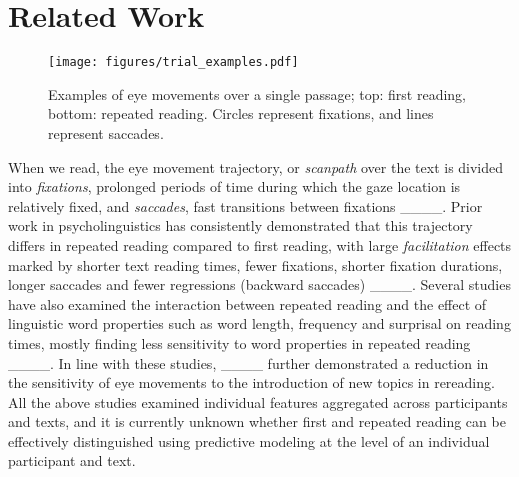 \section{Related Work}
\label{sec:related-work}

\begin{figure}
    \centering
    \texttt{[image: figures/trial\_examples.pdf]}
    \caption{Examples of eye movements over a single passage; top: first reading, bottom: repeated reading. Circles represent fixations, and lines represent saccades.}
    \label{fig:trial-example}
\end{figure}

When we read, the eye movement trajectory, or \emph{scanpath} over the text is divided into \emph{fixations}, prolonged periods of time during which the gaze location is relatively fixed, and \emph{saccades}, fast transitions between fixations ____. Prior work in psycholinguistics has consistently demonstrated that this trajectory differs in repeated reading compared to first reading, with large \emph{facilitation} effects marked by shorter text reading times, fewer fixations, shorter fixation durations, longer saccades and fewer regressions (backward saccades) ____. Several studies have also examined the interaction between repeated reading and the effect of linguistic word properties such as word length, frequency and surprisal on reading times, mostly finding less sensitivity to word properties in repeated reading ____. In line with these studies, ____ further demonstrated a reduction in the sensitivity of eye movements to the introduction of new topics in rereading. All the above studies examined individual features aggregated across participants and texts, and it is currently unknown whether first and repeated reading can be effectively distinguished using predictive modeling at the level of an individual participant and text.



